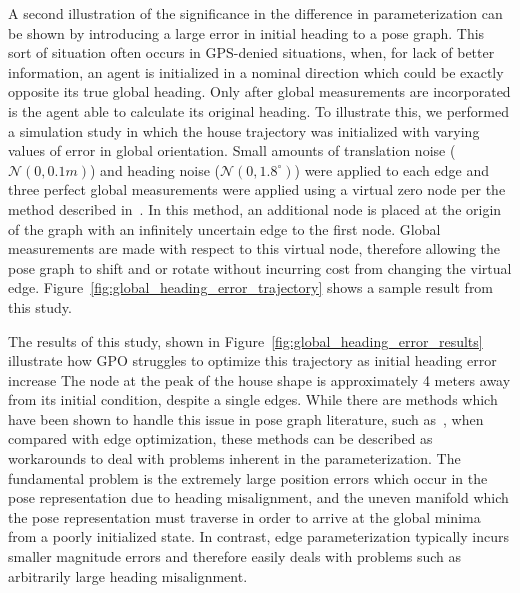 A second illustration of the significance in the difference in parameterization can be shown by introducing a large error in initial heading to a pose graph.  This sort of situation often occurs in GPS-denied situations, when, for lack of better information, an agent is initialized in a nominal direction which could be exactly opposite its true global heading.  Only after global measurements are incorporated is the agent able to calculate its original heading.  To illustrate this, we performed a simulation study in which the house trajectory was initialized with varying values of error in global orientation. Small amounts of translation noise ($\mathcal{N}(0, 0.1m)$) and heading noise ($\mathcal{N}(0, 1.8^\circ)$) were applied to each edge and three perfect global measurements were applied using a virtual zero node per the method described in~\cite{CITE}.  In this method, an additional node is placed at the origin of the graph with an infinitely uncertain edge to the first node.  Global measurements are made with respect to this virtual node, therefore allowing the pose graph to shift and or rotate without incurring cost from changing the virtual edge.  Figure~\ref{fig:global_heading_error_trajectory} shows a sample result from this study.

The results of this study, shown in Figure~\ref{fig:global_heading_error_results} illustrate how GPO struggles to optimize this trajectory as initial heading error increase The node at the peak of the house shape is approximately 4 meters away from its initial condition, despite a single edges.  While there are methods which have been shown to handle this issue in pose graph literature, such as~\cite{Paul, others}, when compared with edge optimization, these methods can be described as workarounds to deal with problems inherent in the parameterization.  The fundamental problem is the extremely large position errors which occur in the pose representation due to heading misalignment, and the uneven manifold which the pose representation must traverse in order to arrive at the global minima from a poorly initialized state.  In contrast, edge parameterization typically incurs smaller magnitude errors and therefore easily deals with problems such as arbitrarily large heading misalignment.

